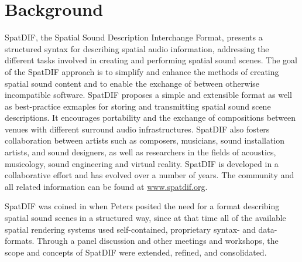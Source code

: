 \documentclass{article}
\title{\papertitle}
\begin{document}
%
\capstartfalse
\maketitle
\capstarttrue
%
\begin{abstract}
The development and specification of SpatDIF, the Spatial Sound Description Interchange Format, is complemented with actual implementations in software in order to become available in various audio software environments.
This article discusses the current state of the development of a software library called `libspatdif', whose purpose is to provide a reference implementation of SpatDIF and demonstrate its best-use practices.
In addition, the design principles derived from the concepts and specifications of SpatDIF, the class structure of the software library, and the concrete implementations demonstrating its usage in computer music applications is presented.
\end{abstract}
%
\section{Background}

SpatDIF, the Spatial Sound Description Interchange Format, presents a structured syntax for describing spatial audio information, addressing the different tasks involved in creating and performing spatial sound scenes.
The goal of the SpatDIF approach is to simplify and enhance the methods of creating spatial sound content and to enable the exchange of between otherwise incompatible software. 
SpatDIF proposes a simple and extensible format as well as best-practice exmaples for storing and transmitting spatial sound scene descriptions. 
It encourages portability and the exchange of compositions between venues with different surround audio infrastructures. 
SpatDIF also fosters collaboration between artists such as composers, musicians, sound installation artists, and sound designers, as well as researchers in the fields of acoustics, musicology, sound engineering and virtual reality.
SpatDIF is developed in a collaborative effort and has evolved over a number of years. 
The community and all related information can be found at \footnotesize{\url{www.spatdif.org}}.\normalsize

SpatDIF was coined in \citeyear{peters_caa07} \cite{peters_caa07} when Peters posited the need for a format describing spatial sound scenes in a structured way, since at that time all of the available spatial rendering systems used self-contained, proprietary syntax- and data-formats.
Through a panel discussion \cite{2008ICMCpanel, Peters:2008spatdif} and other meetings and workshops, the scope and concepts of SpatDIF were extended, refined, and consolidated.
\end{document}
